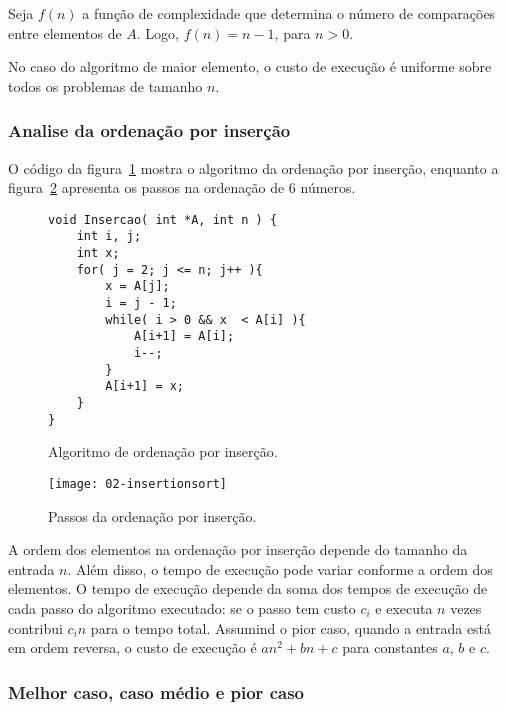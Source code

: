 Seja $f(n)$ a função de complexidade que determina o número de comparações entre elementos de $A$.
Logo, $f(n) = n - 1$, para $n > 0$.

No caso do algoritmo de maior elemento, o custo de execução é uniforme sobre todos os problemas 
de tamanho $n$.

\subsubsection{Analise da ordenação por inserção}

O código da figura~\ref{aula02:algo:insertion} mostra o algoritmo da ordenação
por inserção, enquanto a figura~\ref{aula02:fig:insertion} apresenta os passos
na ordenação de 6 números.
%
\begin{figure}[!htb]
\centering
\begin{framed}
\begin{lstlisting}
void Insercao( int *A, int n ) {
	int i, j;
	int x;
	for( j = 2; j <= n; j++ ){
		x = A[j];
		i = j - 1;
		while( i > 0 && x  < A[i] ){
			A[i+1] = A[i];
			i--;
		}
		A[i+1] = x;
	}
}
\end{lstlisting}
\end{framed}
\caption{Algoritmo de ordenação por inserção.}
\label{aula02:algo:insertion}
\end{figure}
%
\begin{figure}[ht]
\centering
\texttt{[image: 02-insertionsort]}
\caption{Passos da ordenação por inserção.}
\label{aula02:fig:insertion}
\end{figure}

A ordem dos elementos na ordenação por inserção depende do tamanho da entrada $n$. 
Além disso, o tempo de execução pode variar conforme a ordem dos elementos.
%
O tempo de execução depende da soma dos tempos de execução de cada passo do algoritmo
executado: se o passo tem custo $c_i$ e executa $n$ vezes contribui $c_i n$ para o tempo
total.
Assumind o pior caso, quando a entrada está em ordem reversa, o custo de execução é 
$an^2 + bn +c$ para constantes $a$, $b$ e $c$.


\subsubsection{Melhor caso, caso médio e pior caso}

